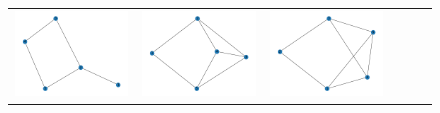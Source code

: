 \documentclass[11pt,a4paper,openright,oneside]{book}
\numberwithin{equation}{section}
\begin{document}
{\begin{figure}[h]
\begin{adjustwidth}{-3cm}{-3cm}
\begin{tabular}{>{\centering\arraybackslash}m{1.5cm} m{2.5cm} m{2.5cm} m{2.5cm} m{2.5cm} m{2.5cm}}
        \rule{0pt}{0.01cm} \includegraphics[width=\linewidth]{media/tnale/graph-1-tnale-12.png} \rule{0pt}{0.01cm}&
        \rule{0pt}{0.01cm} \includegraphics[width=\linewidth]{media/tnale/graph-2-tnale-12.png} \rule{0pt}{0.01cm}&
        \rule{0pt}{0.01cm} \includegraphics[width=\linewidth]{media/tnale/graph-3-tnale-12.png} \rule{0pt}{0.01cm}& 

\end{tabular}
\end{adjustwidth}
\end{figure}}
\end{document}
